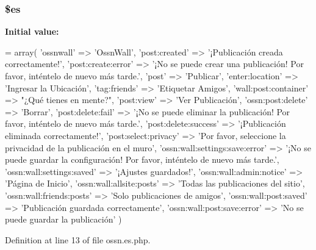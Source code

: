 \subsubsection[{\texorpdfstring{\$es}{$es}}]{\setlength{\rightskip}{0pt plus 5cm}\$es}\hypertarget{components_2_ossn_wall_2locale_2ossn_8es_8php_a388cbda27103d2baee3997798d1f2744}{}\label{components_2_ossn_wall_2locale_2ossn_8es_8php_a388cbda27103d2baee3997798d1f2744}
{\bfseries Initial value\+:}
\begin{DoxyCode}
= array(
        \textcolor{stringliteral}{'ossnwall'} => \textcolor{stringliteral}{'OssnWall'},
        \textcolor{stringliteral}{'post:created'} => \textcolor{stringliteral}{'¡Publicación creada correctamente!'},
        \textcolor{stringliteral}{'post:create:error'} => \textcolor{stringliteral}{'¡No se puede crear una publicación! Por favor, inténtelo de nuevo más
       tarde.'},
        \textcolor{stringliteral}{'post'} => \textcolor{stringliteral}{'Publicar'},
        \textcolor{stringliteral}{'enter:location'} => \textcolor{stringliteral}{'Ingresar la Ubicación'},
        \textcolor{stringliteral}{'tag:friends'} => \textcolor{stringliteral}{'Etiquetar Amigos'},
        \textcolor{stringliteral}{'wall:post:container'} => \textcolor{stringliteral}{"¿Qué tienes en mente?"},
        \textcolor{stringliteral}{'post:view'} => \textcolor{stringliteral}{'Ver Publicación'},
        \textcolor{stringliteral}{'ossn:post:delete'} => \textcolor{stringliteral}{'Borrar'},
        \textcolor{stringliteral}{'post:delete:fail'} => \textcolor{stringliteral}{'¡No se puede eliminar la publicación! Por favor, inténtelo de nuevo más
       tarde.'},
        \textcolor{stringliteral}{'post:delete:success'} => \textcolor{stringliteral}{'¡Publicación eliminada correctamente!'},
        \textcolor{stringliteral}{'post:select:privacy'} => \textcolor{stringliteral}{'Por favor, seleccione la privacidad de la publicación en el muro'},
        \textcolor{stringliteral}{'ossn:wall:settings:save:error'} => \textcolor{stringliteral}{'¡No se puede guardar la configuración! Por favor, inténtelo de
       nuevo más tarde.'},
        \textcolor{stringliteral}{'ossn:wall:settings:saved'} => \textcolor{stringliteral}{'¡Ajustes guardados!'},
        \textcolor{stringliteral}{'ossn:wall:admin:notice'} => \textcolor{stringliteral}{'Página de Inicio'},
        \textcolor{stringliteral}{'ossn:wall:allsite:posts'} => \textcolor{stringliteral}{'Todas las publicaciones del sitio'},
        \textcolor{stringliteral}{'ossn:wall:friends:posts'} => \textcolor{stringliteral}{'Solo publicaciones de amigos'},
        \textcolor{stringliteral}{'ossn:wall:post:saved'} => \textcolor{stringliteral}{'Publicación guardada correctamente'},
        \textcolor{stringliteral}{'ossn:wall:post:save:error'} => \textcolor{stringliteral}{'No se puede guardar la publicación'}
)
\end{DoxyCode}


Definition at line 13 of file ossn.\+es.\+php.

